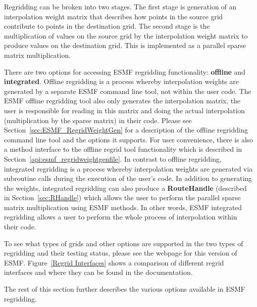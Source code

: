  Regridding can be broken into two stages. The first stage is generation of an interpolation weight matrix that describes how points in 
 the source grid contribute to points in the destination grid. The second stage is the multiplication of values on the source grid by the
 interpolation weight matrix to produce values on the destination grid. This is implemented as a parallel sparse matrix multiplication.

 There are two options for accessing ESMF regridding functionality: {\bf offline} and {\bf integrated}. Offline regridding is a process whereby interpolation 
 weights are generated by a separate ESMF command line tool, not within the user code. The ESMF offline regridding tool also only generates the interpolation 
 matrix, the user is responsible for reading in this matrix and doing the actual interpolation (multiplication by the sparse matrix) in their code.
 Please see Section~\ref{sec:ESMF_RegridWeightGen} for a description of the offline regridding command line tool and the options it supports. For user convenience, there
 is also a method interface to the offline regrid tool functionality which is described in Section~\ref{api:esmf_regridweightgenfile}.
 In contrast to offline regridding, integrated regridding is a process whereby interpolation weights are generated via subroutine calls during the
 execution of the user's code. In addition to generating the weights, integrated regridding can also produce a {\bf RouteHandle} (described in Section~\ref{sec:RHandle}) which allows the user to perform the parallel sparse 
 matrix multiplication using ESMF methods. In other words, ESMF integrated regridding allows a user to perform the whole process of interpolation within their code. 

 To see what types of grids and other options are supported in the two types of regridding and their testing status, please see the  webpage for this version of ESMF.
 Figure~\ref{Regrid Interfaces} shows a comparison of different regrid interfaces and where they can be found in the documentation. 

 The rest of this section further describes the various options available in ESMF regridding. 

